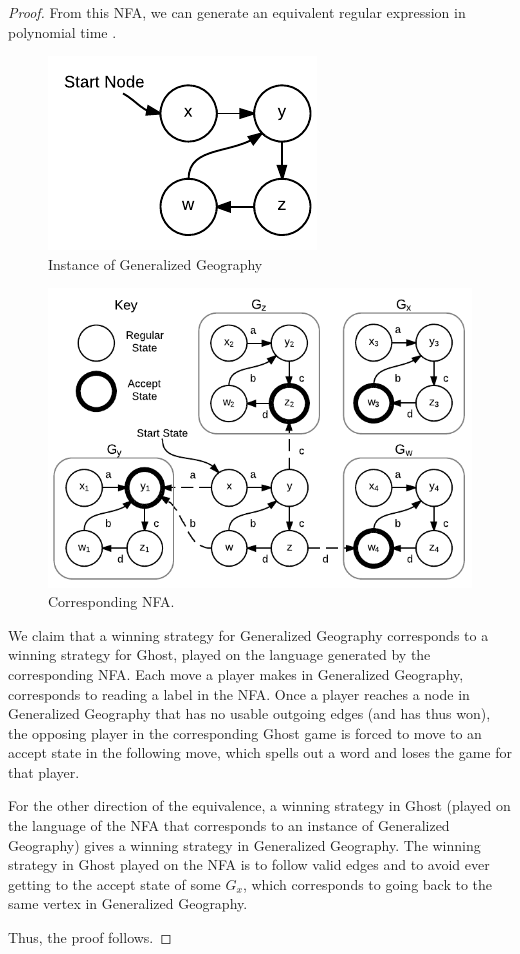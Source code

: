 \documentclass[11pt]{article}
\begin{document}
\begin{proof}
From this NFA, we can generate an equivalent regular expression in polynomial time \cite{theoryofcomp}.
\begin{figure}
\centering
\includegraphics[width=0.3\linewidth]{Ghost1.pdf}
\caption{Instance of Generalized Geography}
\label{fig:instance}
\end{figure}

\begin{figure}
\centering
\includegraphics[width=0.6\linewidth]{Ghost2.pdf}
\caption{Corresponding NFA.}
\label{fig:reduction}
\end{figure}

We claim that a winning strategy for Generalized Geography corresponds to a winning strategy for Ghost, played on the language generated by the corresponding NFA. Each move a player makes in Generalized Geography, corresponds to reading a label in the NFA. Once a player reaches a node in Generalized Geography that has no usable outgoing edges (and has thus won), the opposing player in the corresponding Ghost game is forced to move to an accept state in the following move, which spells out a word and loses the game for that player. 

For the other direction of the equivalence, a winning strategy in Ghost (played on the language of the NFA that corresponds to an instance of Generalized Geography) gives a winning strategy in Generalized Geography. The winning strategy in Ghost played on the NFA is to follow valid edges and to avoid ever getting to the accept state of some $G_x$, which corresponds to going back to the same vertex in Generalized Geography.

Thus, the proof follows. 
\end{proof}
\end{document}
